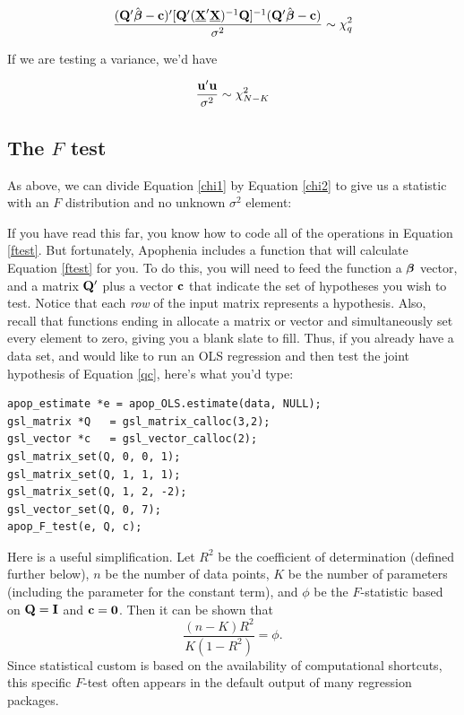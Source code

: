 \begin{equation}		\label{chi1}
{({\bf Q}'\hat{{\mbox{\boldmath$\beta$}}}- {\bf c})' [{\bf Q}' (\underbar{\bf X}'\underbar{\bf X})^{-1} {\bf Q}]^{-1} ({\bf Q}' \hat{{\mbox{\boldmath$\beta$}}}- {\bf c})
\over \sigma^2} \sim \chi^2_q
\end{equation}

If we are testing a variance, we'd have 

\begin{equation}		\label{chi2}
{{\bf u}' {\bf u} \over \sigma^2} \sim \chi^2_{N-K}
\end{equation}


\subsection{The $F$ test}\label{ftestsec}

As above, we can divide Equation \ref{chi1} by Equation \ref{chi2}
to give us a statistic with an $F$ distribution and no unknown
$\sigma^2$ element:



If you have read this far, you know how to code all of the operations
in Equation \ref{ftest}.  But fortunately, 
Apophenia includes a function that will calculate Equation \ref{ftest}
for you.
To do this, you will need to feed the function a ${\mbox{\boldmath$\beta$}}$ vector, and a
matrix ${\bf Q}'$ plus a vector ${\bf c}$ that indicate the set of hypotheses
you wish to test. Notice that each {\em row} of the input matrix represents a
hypothesis. Also, recall that functions ending in  allocate
a matrix or vector and simultaneously set every element to zero, giving
you a blank slate to fill. Thus, if you already have a data set, and
would like to run an OLS regression and then test the joint hypothesis
of Equation \ref{qc}, here's what you'd type:
\begin{lstlisting}
apop_estimate *e = apop_OLS.estimate(data, NULL);
gsl_matrix *Q   = gsl_matrix_calloc(3,2);
gsl_vector *c   = gsl_vector_calloc(2);
gsl_matrix_set(Q, 0, 0, 1);
gsl_matrix_set(Q, 1, 1, 1);
gsl_matrix_set(Q, 1, 2, -2);
gsl_vector_set(Q, 0, 7);
apop_F_test(e, Q, c);
\end{lstlisting}

Here is a useful simplification.
Let $R^2$ be the coefficient of determination (defined further below),
$n$ be the number of data points, $K$ be the number of parameters
(including the parameter for the constant term), and $\phi$ be the
$F$-statistic
based on ${\bf Q} = {\bf I}$ and ${\bf c} = {\bf 0}$. Then it can be shown that 
\begin{equation}
\frac{(n-K) R^2}{K (1-R^2)} = \phi.    \label{rsqandf}
\end{equation}
Since statistical custom is based on the availability of computational
shortcuts, this specific $F$-test often appears in the default output
of many regression packages.  

